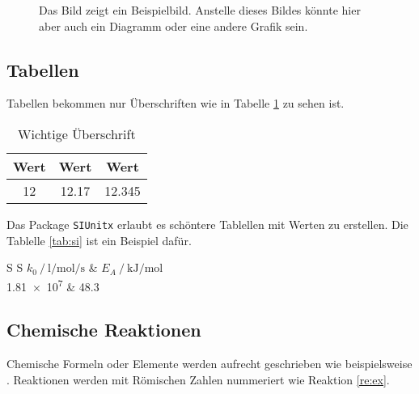 \begin{figure}[h] 
    \centering
    \caption{Das Bild zeigt ein Beispielbild. Anstelle dieses Bildes könnte hier aber auch ein Diagramm oder eine andere Grafik sein.}
    \label{fig:example_a} %
\end{figure}

\FloatBarrier

\subsection{Tabellen}
Tabellen bekommen nur Überschriften wie in Tabelle \ref{tab:use} zu sehen ist.

\begin{table}[h]
	\centering
	\caption{Wichtige Überschrift}
	\begin{tabular}{c|c c}
		Wert & Wert & Wert \\
		\hline
		\num{12} &  \num{12,17}& \num{12,345} \\
		\hline		
	\end{tabular}
	\label{tab:use}	
\end{table}

Das Package \texttt{SIUnitx} \cite{SIUnitx} erlaubt es schöntere Tablellen mit Werten zu erstellen. Die Tablelle \ref{tab:si} ist ein Beispiel dafür.

\begin{table}[h]
	\centering
	\caption{Tabelle mit \texttt{SIUnitx}}
	\begin{tabular}{S S}
		\toprule
		{$k_0 \mathbin{/} \unit{\litre\per\mole\per\second}$} & {$E_A \mathbin{/} \unit{\kilo\joule\per\mole}$} \\
		\midrule
		\num{1,81 e7} & \num{48,3} \\
		\bottomrule
	\end{tabular}
	\label{tab:si}	
\end{table}

\subsection{Chemische Reaktionen}

Chemische Formeln oder Elemente werden aufrecht geschrieben wie beispielsweise .
Reaktionen werden mit Römischen Zahlen nummeriert wie Reaktion \eqref{re:ex}.

\begin{reaction} \label{re:ex}
\end{reaction}

